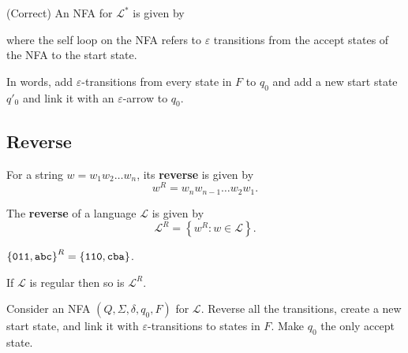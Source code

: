 \documentclass{notes}
\begin{document}
\begin{prf}
  {\color{green} (Correct)} An NFA for $\mathcal L^*$ is given by 

  \begin{center}
  \end{center}
  where the self loop on the NFA refers to $\varepsilon$ transitions from the accept states of the NFA to the start state.
  
  In words, add $\varepsilon$-transitions from every state in $F$ to $q_0$ and add a new start state $q'_0$ and link it with an $\varepsilon$-arrow to $q_0$.
\end{prf}

\subsection{Reverse}

\begin{defn}
  For a string $w = w_1 w_2 \dots w_n$, its {\boldmath \bfseries reverse} is given by 
  \[
    w^R = w_n w_{n - 1} \dots w_2 w_1.
  \]
\end{defn}

\begin{defn}
  The {\boldmath \bfseries reverse} of a language $\mathcal L$ is given by
  \[
    \mathcal L^R = \left \{ w^R : w \in \mathcal L \right \}.
  \]
\end{defn}

\begin{eg}
  $\left \{ \verb~011~, \verb~abc~ \right \}^R = \left \{ \verb~110~, \verb~cba~ \right \}$.
\end{eg}

\begin{thm}
  If $\mathcal L$ is regular then so is $\mathcal L^R$.
\end{thm}

\begin{prf}
  Consider an NFA $(Q, \Sigma, \delta, q_0, F)$ for $\mathcal L$.
  Reverse all the transitions, create a new start state, and link it with $\varepsilon$-transitions to states in $F$.
  Make $q_0$ the only accept state.
\end{prf}
\end{document}
